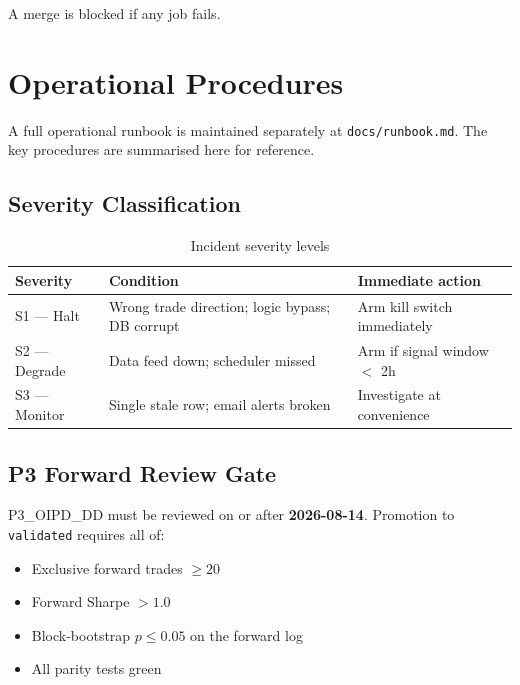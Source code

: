 \documentclass[12pt, a4paper]{article}
\theoremstyle{definition}
\begin{document}
A merge is blocked if any job fails.

\section{Operational Procedures}

A full operational runbook is maintained separately at \texttt{docs/runbook.md}.
The key procedures are summarised here for reference.

\subsection{Severity Classification}

\begin{table}[H]
\centering
\caption{Incident severity levels}
\begin{tabular}{lll}
\toprule
\textbf{Severity} & \textbf{Condition} & \textbf{Immediate action} \\
\midrule
S1 — Halt    & Wrong trade direction; logic bypass; DB corrupt & Arm kill switch immediately \\
S2 — Degrade & Data feed down; scheduler missed             & Arm if signal window $<$ 2h \\
S3 — Monitor & Single stale row; email alerts broken        & Investigate at convenience \\
\bottomrule
\end{tabular}
\end{table}

\subsection{P3 Forward Review Gate}

P3\_OIPD\_DD must be reviewed on or after \textbf{2026-08-14}. Promotion to
\texttt{validated} requires all of:

\begin{itemize}[leftmargin=2em]
    \item Exclusive forward trades $\geq 20$
    \item Forward Sharpe $> 1.0$
    \item Block-bootstrap $p \leq 0.05$ on the forward log
    \item All parity tests green
\end{itemize}
\end{document}

